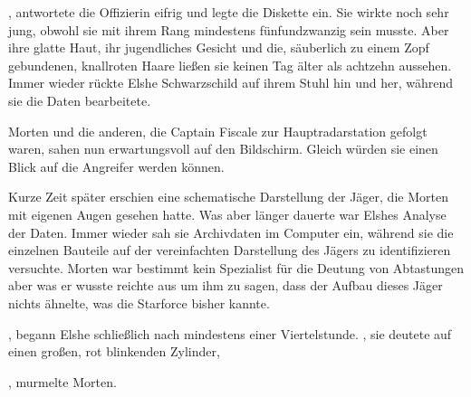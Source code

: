 \par

, antwortete die Offizierin eifrig und legte die Diskette ein. Sie wirkte noch sehr jung, obwohl sie mit ihrem Rang mindestens fünfundzwanzig sein musste. Aber ihre glatte Haut, ihr jugendliches Gesicht und die, säuberlich zu einem Zopf gebundenen, knallroten Haare ließen sie keinen Tag älter als achtzehn aussehen. Immer wieder rückte Elshe Schwarzschild auf ihrem Stuhl hin und her, während sie die Daten bearbeitete.

\par

Morten und die anderen, die Captain Fiscale zur Hauptradarstation gefolgt waren, sahen nun erwartungsvoll auf den Bildschirm. Gleich würden sie einen Blick auf die Angreifer werden können.

\par

Kurze Zeit später erschien eine schematische Darstellung der Jäger, die Morten mit eigenen Augen gesehen hatte. Was aber länger dauerte war Elshes Analyse der Daten. Immer wieder sah sie Archivdaten im Computer ein, während sie die einzelnen Bauteile auf der vereinfachten Darstellung des Jägers zu identifizieren versuchte. Morten war bestimmt kein Spezialist für die Deutung von Abtastungen aber was er wusste reichte aus um ihm zu sagen, dass der Aufbau dieses Jäger nichts ähnelte, was die Starforce bisher kannte.

\par

, begann Elshe schließlich nach mindestens einer Viertelstunde. , sie deutete auf einen großen, rot blinkenden Zylinder, 

\par

, murmelte Morten.

\par


\par

